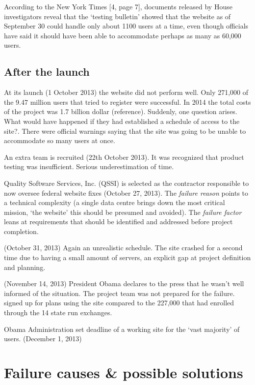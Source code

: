 \documentclass[]{article}
\begin{document}
According to the New York Times {[}4, page 7{]}, documents released by
House investigators reveal that the `testing bulletin' showed that the
website as of September 30 could handle only about 1100 users at a time,
even though officials have said it should have been able to accommodate
perhaps as many as 60,000 users.

\subsection{After the launch}\label{after-the-launch}

At its launch (1 October 2013) the website did not perform well. Only
271,000 of the 9.47 million users that tried to register were
successful. In 2014 the total costs of the project was 1.7 billion
dollar (reference). Suddenly, one question arises. What would have
happened if they had established a schedule of access to the site?.
There were official warnings saying that the site was going to be unable
to accommodate so many users at once.

An extra team is recruited (22th October 2013). It was recognized that
product testing was insufficient. Serious underestimation of time.

Quality Software Services, Inc. (QSSI) is selected as the contractor
responsible to now oversee federal website fixes (October 27, 2013). The
\emph{failure reason} points to a technical complexity (a single data
centre brings down the most critical mission, `the website' this should
be presumed and avoided). The \emph{failure factor} leans at
requirements that should be identified and addressed before project
completion.

(October 31, 2013) Again an unrealistic schedule. The site crashed for a
second time due to having a small amount of servers, an explicit gap at
project definition and planning.

(November 14, 2013) President Obama declares to the press that he wasn't
well informed of the situation. The project team was not prepared for
the failure. signed up for plans using the site compared to the 227,000
that had enrolled through the 14 state run exchanges.

Obama Administration set deadline of a working site for the `vast
majority' of users. (December 1, 2013)

\section{Failure causes \& possible
solutions}\label{failure-causes-possible-solutions}
\end{document}
